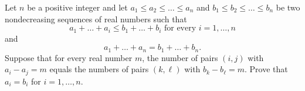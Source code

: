 Let $n$ be a positive integer and let $a_1 \le a_2 \le \dots \le a_n$ and $b_1 \le b_2 \le \dots \le b_n$ be two nondecreasing sequences of real numbers such that \[ a_1 + \dots + a_i \le b_1 + \dots + b_i  \text{ for every } i = 1, \dots, n \] and \[ a_1 + \dots + a_n = b_1 + \dots + b_n. \] Suppose that for every real number $m$, the number of pairs $(i,j)$ with $a_i-a_j=m$ equals the numbers of pairs $(k,\ell)$ with $b_k-b_\ell = m$. Prove that $a_i = b_i$ for $i=1,\dots,n$.